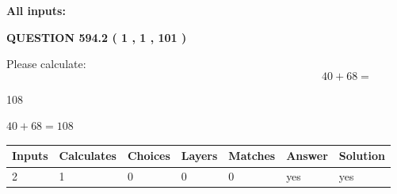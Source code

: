 \documentclass[12pt]{article}
\begin{document}
   
   
   
\noindent{}
   
   
   
   
\noindent\vspace{0.1in}\hspace{-0.08in} {\textbf{\Large{All inputs: }}}
   
   
  
\vspace{0.2in}
  
{\textbf{\Large{QUESTION
594.2 
 ( 1 , 1 , 101 )
}}}
  
  
 
Please calculate:
\begin{equation}
40 +  %
68 = \nonumber
\end{equation}
 
 
 
\noindent{}
 
 

108
 
 
\noindent{}
 
 

 
 
 
\noindent{}
 
 

$ %
40 +  %
68=   %
108$
 
 
\noindent{}
 
 

 
   
   
   
   
\noindent\begin{tabular}{|l|l|l|l|l|l|l|}
 \hline
Inputs & Calculates & Choices & Layers & Matches & Answer & Solution \\ \hline
 2  & 
 1  & 
 0
  & 
 0  & 
 0  & 
  yes & 
  yes 
  \\ \hline
 \end{tabular}
   
   
   
   
\noindent{}
   
\end{document}
